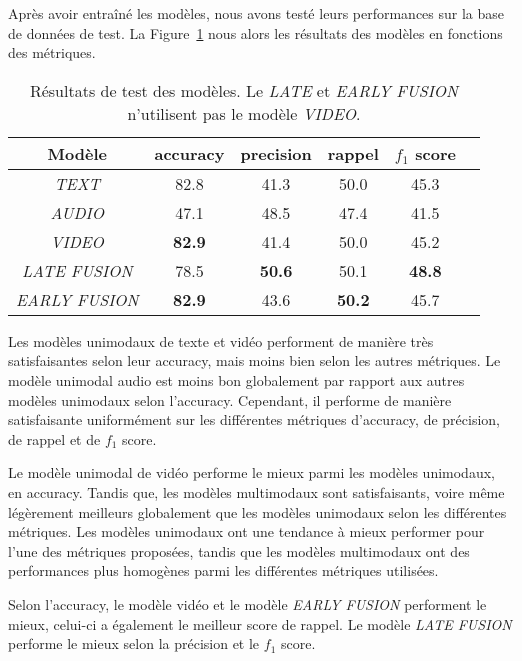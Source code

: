 Après avoir entraîné les modèles, nous avons testé leurs performances sur la base de données de test.
La Figure~\ref{tab: test} nous alors les résultats des modèles en fonctions des métriques.

\begin{table}[H]
    \centering
    \begin{tabular}{|c|c|c|c|c|c|}
        \hline
        Modèle & accuracy & precision & rappel & $f_1$ score\\
        \hline
        \textit{TEXT} & 82.8 & 41.3 & 50.0 & 45.3\\
        \hline
        \textit{AUDIO} & 47.1 & 48.5 & 47.4 & 41.5\\
        \hline
        \textit{VIDEO} & \textbf{82.9} & 41.4 & 50.0 & 45.2\\
        \hline
        \textit{LATE FUSION} & 78.5 & \textbf{50.6} & 50.1 & \textbf{48.8}\\
        \hline
        \textit{EARLY FUSION} & \textbf{82.9} & 43.6 & \textbf{50.2} & 45.7\\
        \hline
    \end{tabular}
    \caption{Résultats de test des modèles. Le \textit{LATE} et \textit{EARLY FUSION} n'utilisent pas le modèle \textit{VIDEO}.}
    \label{tab: test}
\end{table}

Les modèles unimodaux de texte et vidéo performent de manière très satisfaisantes selon leur accuracy, mais moins bien selon les autres métriques.
Le modèle unimodal audio est moins bon globalement par rapport aux autres modèles unimodaux selon l'accuracy. 
Cependant, il performe de manière satisfaisante uniformément sur les différentes métriques d'accuracy, de précision, de rappel et de $f_1$ score. 

Le modèle unimodal de vidéo performe le mieux parmi les modèles unimodaux, en accuracy. Tandis que, les modèles multimodaux sont satisfaisants, voire même légèrement meilleurs globalement que les modèles unimodaux selon les différentes métriques. 
Les modèles unimodaux ont une tendance à mieux performer pour l'une des métriques proposées, tandis que les modèles multimodaux ont des performances plus homogènes parmi les différentes métriques utilisées. 

Selon l'accuracy, le modèle vidéo et le modèle \textit{EARLY FUSION} performent le mieux, celui-ci a également le meilleur score de rappel. Le modèle \textit{LATE FUSION} performe le mieux selon la précision et le $f_1$ score.